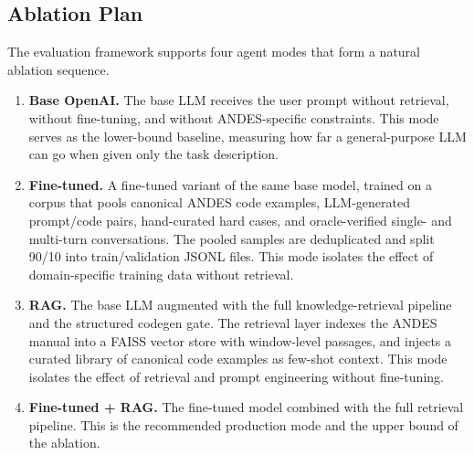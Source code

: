 \documentclass[journal]{IEEEtran}
\begin{document}
\subsection{Ablation Plan}
\label{subsec:ablation}

The evaluation framework supports four agent modes that form a natural ablation sequence.
\begin{enumerate}
\item \textbf{Base OpenAI.}
      The base LLM receives the user prompt without retrieval, without fine-tuning, and without ANDES-specific constraints.
      This mode serves as the lower-bound baseline, measuring how far a general-purpose LLM can go when given only the task description.
\item \textbf{Fine-tuned.}
      A fine-tuned variant of the same base model, trained on a corpus that pools canonical ANDES code examples, LLM-generated prompt/code pairs, hand-curated hard cases, and oracle-verified single- and multi-turn conversations.
      The pooled samples are deduplicated and split 90/10 into train/validation JSONL files. This mode isolates the effect of domain-specific training data without retrieval.
\item \textbf{RAG.}
      The base LLM augmented with the full knowledge-retrieval pipeline and the structured codegen gate.
      The retrieval layer indexes the ANDES manual into a FAISS vector store with window-level passages, and injects a curated library of canonical code examples as few-shot context.
      This mode isolates the effect of retrieval and prompt engineering without fine-tuning.
\item \textbf{Fine-tuned + RAG.}
      The fine-tuned model combined with the full retrieval pipeline.
      This is the recommended production mode and the upper bound of the ablation.
\end{enumerate}


\end{document}
